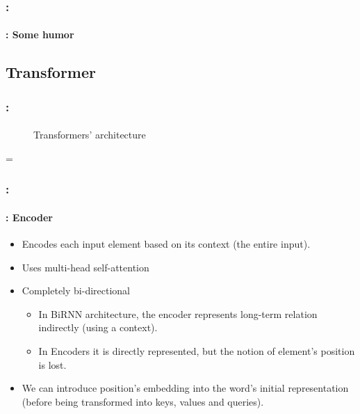 \documentclass[xcolor=table]{beamer}
\begin{document}
\begin{frame}
	\frametitle{\insertshortsubtitle: \insertsection}
	\framesubtitle{\insertsubsection: Some humor}
	
	
\end{frame}


\subsection{Transformer}

\begin{frame}
	\frametitle{\insertshortsubtitle: \insertsection}
	\framesubtitle{\insertsubsection}

	\begin{minipage}{0.49\textwidth}
		\begin{figure}
			\centering
			\vskip-8pt
			\caption{Transformers' architecture \cite{2017-vaswani-al}}
		\end{figure}
	\end{minipage}
	\begin{minipage}{0.1\textwidth}
		=
	\end{minipage}
	\begin{minipage}{0.39\textwidth}
	\end{minipage}

	
\end{frame}

\begin{frame}
	\frametitle{\insertshortsubtitle: \insertsection}
	\framesubtitle{\insertsubsection: Encoder}
	
	\begin{itemize}
		\item Encodes each input element based on its context (the entire input).
		\item Uses multi-head self-attention
		\item Completely bi-directional
		\begin{itemize}
			\item In BiRNN architecture, the encoder represents long-term relation indirectly (using a context).
			\item In Encoders it is directly represented, but the notion of element's position is lost.
		\end{itemize} 
		\item We can introduce position's embedding into the word's initial representation (before being transformed into keys, values and queries).
	\end{itemize}
	
\end{frame}
\end{document}
